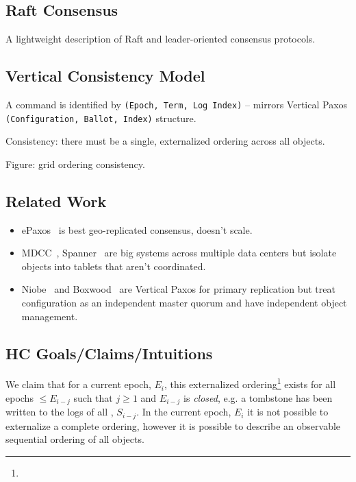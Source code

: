 \documentclass[10pt,twocolumn]{article}
\begin{document}
\subsection*{Raft Consensus}

A lightweight description of Raft and leader-oriented consensus protocols.

\subsection*{Vertical Consistency Model}

A command is identified by \texttt{(Epoch, Term, Log Index)} -- mirrors
Vertical Paxos \texttt{(Configuration, Ballot, Index)} structure.

Consistency: there must be a single, externalized ordering across all
objects.

Figure: grid ordering consistency.  

\subsection*{Related Work}

\begin{itemize}
    \item ePaxos~\cite{epaxos} is best geo-replicated consensus, doesn't
    scale.
    \item MDCC~\cite{mdcc}, Spanner~\cite{spanner} are big systems across
    multiple data centers but isolate objects into tablets that aren't
    coordinated. 
    \item Niobe~\cite{niobe} and Boxwood~\cite{boxwood} are Vertical Paxos
    for primary replication but treat configuration as an independent master
    quorum and have independent object management.
\end{itemize}

\subsection*{HC Goals/Claims/Intuitions}

 We claim that for a current epoch, $E_i$,
this externalized ordering\footnote{} exists
for all epochs $\leq E_{i-j}$ such that $j\geq1$ and $E_{i-j}$ is
\emph{closed}, e.g. a tombstone has been written to the logs of all \subs,
$S_{i-j}$.
In the current epoch, $E_i$ it is not possible to externalize a complete
ordering,  however it is possible to describe an observable sequential
ordering of all objects.
\end{document}
